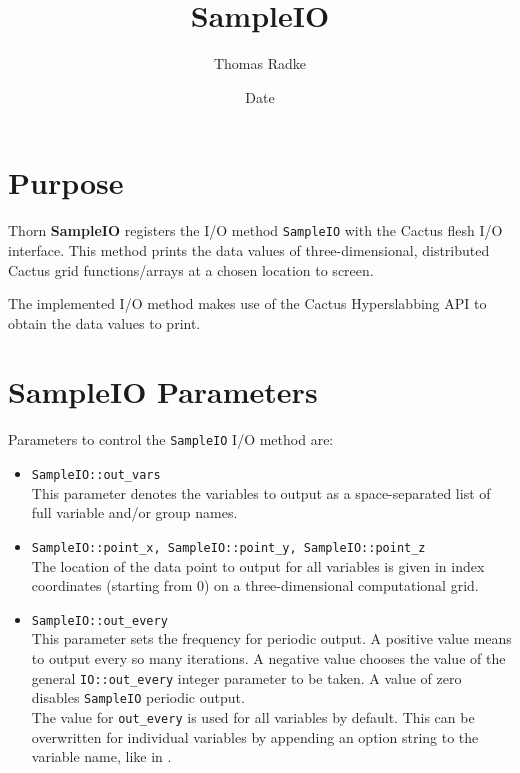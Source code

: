 \documentclass{article}
\begin{document}
\title{SampleIO}
\author{Thomas Radke}
\date{$ $Date$ $}
\maketitle


\section{Purpose}
Thorn {\bf SampleIO} registers the I/O method {\tt SampleIO} with the Cactus
flesh I/O interface. This method prints the data values of
three-dimensional, distributed Cactus grid functions/arrays at a chosen
location to screen.

The implemented I/O method makes use of the Cactus Hyperslabbing API to obtain
the data values to print.

\section{{\bf SampleIO} Parameters}
Parameters to control the {\tt SampleIO} I/O method are:

\begin{itemize}
  \item{\tt SampleIO::out\_vars}\\
    This parameter denotes the variables to output as a space-separated list
    of full variable and/or group names.
  \item{\tt SampleIO::point\_x, SampleIO::point\_y, SampleIO::point\_z}\\
    The location of the data point to output for all variables is given in
    index coordinates (starting from 0) on a three-dimensional computational
    grid.
  \item{\tt SampleIO::out\_every}\\
    This parameter sets the frequency for periodic output.
    A positive value means to output every so many iterations. A negative value
    chooses the value of the general {\tt IO::out\_every} integer parameter to
    be taken.  A value of zero disables {\tt SampleIO} periodic output.\\
    The value for {\tt out\_every} is used for all variables by default.
    This can be overwritten for individual variables by appending an option
    string to the variable name, like in
    .
\end{itemize}
\end{document}
